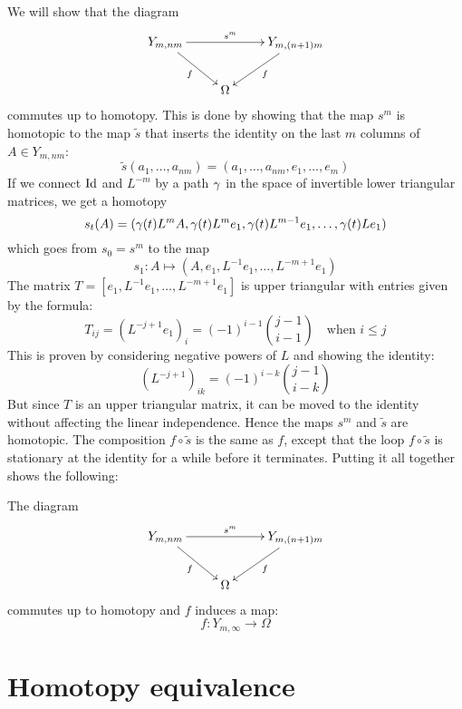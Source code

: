 We will show that the diagram
\[ \xymatrix{ Y_{m,nm} \ar[rr]^{s^m}\ar[dr]_f & & Y_{m,(n+1)m} \ar[dl]^f \\
  & \Omega & } \]
commutes up to homotopy. This is done by showing that the map $s^m$ is
homotopic to the map $\widetilde s$ that inserts the identity on the
last $m$ columns of $A \in Y_{m,nm}$:
\[ \widetilde s (a_1,\dots,a_{nm}) = (a_1,\dots,a_{nm},e_1,\dots,e_m) \]
If we connect $\operatorname{Id}$ and $L^{-m}$ by a path $\gamma$ in the space of
invertible lower triangular matrices, we get a homotopy
\[ s_t(A) = (\gamma(t)L^mA,
\gamma(t)L^me_1,\gamma(t)L^{m-1}e_1,\dots,\gamma(t)Le_1) \]
which goes from $s_0 = s^m$ to the map
\[ s_1 : A \mapsto (A,e_1,L^{-1}e_1,\dots,L^{-m+1}e_1) \]
The matrix $T = [e_1,L^{-1}e_1,\dots,L^{-m+1}e_1]$ is upper
triangular with entries given by the formula:
\[ T_{ij} = (L^{-j+1}e_1)_i = (-1)^{i-1}\binom{j-1}{i-1} \quad
\text{when } i \leq j \]
This is proven by considering negative powers of $L$ and showing the
identity:
\[ (L^{-j+1})_{ik} = (-1)^{i-k}\binom{j-1}{i-k} \]
But since $T$ is an upper triangular matrix, it can be moved to the
identity without affecting the linear independence.
Hence the maps $s^m$ and $\widetilde s$ are homotopic. The composition
$f\circ \widetilde s$ is the same as $f$, except that the loop
$f\circ\widetilde s$ is stationary at the identity for a while before
it terminates. Putting it all together shows the following:
\begin{lemma}
  The diagram
  \[ \xymatrix{ Y_{m,nm} \ar[rr]^{s^m}\ar[dr]_{f} & & \ar[dl]^f
    Y_{m,(n+1)m} \\
    & \Omega & } \]
  commutes up to homotopy and $f$ induces a map:
  \[ f : Y_{m,\infty} \to \Omega \]
\end{lemma}

\section{Homotopy equivalence}

